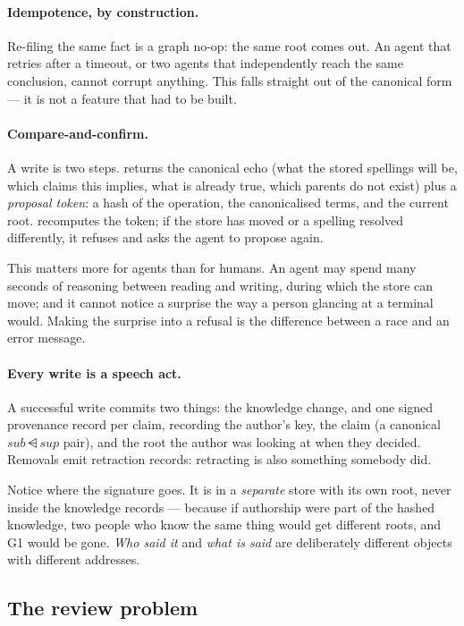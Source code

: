 \paragraph{Idempotence, by construction.} Re-filing the same fact is a graph
no-op: the same root comes out. An agent that retries after a timeout, or two
agents that independently reach the same conclusion, cannot corrupt anything.
This falls straight out of the canonical form --- it is not a feature that had
to be built.

\paragraph{Compare-and-confirm.} A write is two steps. 
returns the canonical echo (what the stored spellings will be, which claims
this implies, what is already true, which parents do not exist) plus a
\emph{proposal token}: a hash of the operation, the canonicalised terms, and
the current root.  recomputes the token; if the store has moved or a
spelling resolved differently, it refuses and asks the agent to propose again.

This matters more for agents than for humans. An agent may spend many seconds
of reasoning between reading and writing, during which the store can move; and
it cannot notice a surprise the way a person glancing at a terminal would.
Making the surprise into a refusal is the difference between a race and an
error message.

\paragraph{Every write is a speech act.} A successful write commits two
things: the knowledge change, and one signed provenance record per claim,
recording the author's key, the claim (a canonical
$\mathit{sub} \dsub \mathit{sup}$ pair), and the root the author was looking
at when they decided. Removals emit retraction records: retracting is also
something somebody did.

Notice where the signature goes. It is in a \emph{separate} store with its own
root, never inside the knowledge records --- because if authorship were part
of the hashed knowledge, two people who know the same thing would get
different roots, and G1 would be gone. \emph{Who said it} and \emph{what is
said} are deliberately different objects with different addresses.

\subsection{The review problem}
\label{sec:agents-review}

